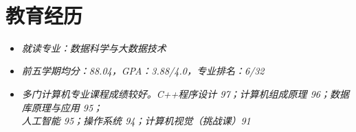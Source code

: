\documentclass{resume}
\begin{document}



{\,}





\section{教育经历}


\begin{itemize} [parsep=1ex]
  \item \textit{就读专业：数据科学与大数据技术}
  
  \item \textit{前五学期均分：88.04，GPA：3.88/4.0，专业排名：6/32}

  \item \textit{多门计算机专业课程成绩较好。C++程序设计 97；计算机组成原理 96；数据库原理与应用 95；\\人工智能 95；操作系统 94；计算机视觉（挑战课）91}
\end{itemize}
\end{document}
